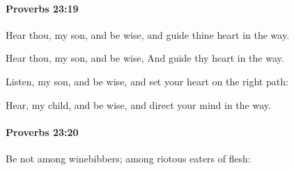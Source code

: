 		\paragraph{Proverbs 23:19} %
			\label{PROVERBS-23-19}

			Hear thou, my son, and be wise, and guide thine heart in the way.

			\begin{versebox}
					\item[BHS] 
					\item[ASV] Hear thou, my son, and be wise, And guide thy heart in the way.
					\item[NIV] Listen, my son, and be wise, and set your heart on the right path:
					\item[NRSV] Hear, my child, and be wise, and direct your mind in the way.
			\end{versebox}

		\paragraph{Proverbs 23:20} %
			\label{PROVERBS-23-20}

			Be not among winebibbers; among riotous eaters of flesh:

